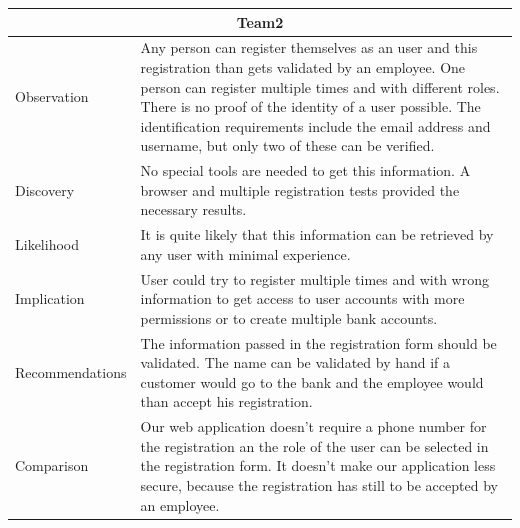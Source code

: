 \documentclass[headsepline,footsepline,footinclude=false,oneside,fontsize=11pt,paper=a4,listof=totoc,bibliography=totoc]{scrbook} %
\begin{document}
\begin{tabular}{ l|p{11cm}  }
	\hline
	\multicolumn{2}{c}{\textbf{Team2}} \\
	\hline
	Observation   & Any person can register themselves as an user and this registration than gets validated by an employee. One person can register multiple times and with different roles. There is no proof of the identity of a user possible. The identification requirements include the email address and username, but only two of these can be verified. \\
	Discovery  & No special tools are needed to get this information. A browser and multiple registration tests provided the necessary results. \\
	Likelihood & It is quite likely that this information can be retrieved by any user with minimal experience. \\
	Implication    & User could try to register multiple times and with wrong information to get access to user accounts with more permissions or to create multiple bank accounts. \\
	Recommendations & The information passed in the registration form should be validated. The name can be validated by hand if a customer would go to the bank and the employee would than accept his registration. \\
	Comparison & Our web application doesn't require a phone number for the registration an the role of the user can be selected in the registration form. It doesn't make our application less secure, because the registration has still to be accepted by an employee. \\
	\hline
\end{tabular}
\\
\vspace{0.5cm}
\\
\end{document}
